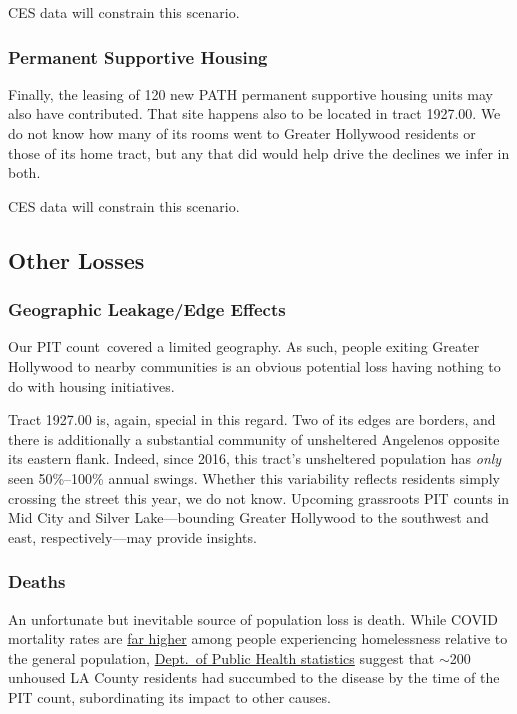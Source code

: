 \documentclass[11pt,twocolumn]{article}
\def\Count{count}
\def\resp{respectively}
\begin{document}
CES data will constrain this scenario.

\subsubsection{Permanent Supportive Housing}

Finally, the leasing of 120 new PATH permanent supportive housing units may also have contributed. 
That site happens also to be located in tract 1927.00. We do not know how many of its rooms went to Greater Hollywood 
residents or those of its home tract, but any that did would help drive the declines we infer in both.

CES data will constrain this scenario.

\subsection{Other Losses}

\subsubsection{Geographic Leakage/Edge Effects}

Our PIT \Count\ covered a limited geography. As such, people exiting Greater Hollywood to nearby communities
is an obvious potential loss having nothing to do with housing initiatives. 

Tract 1927.00 is, again, special in this regard. Two of its edges are borders, and there is additionally a substantial 
community of unsheltered Angelenos opposite its eastern flank. Indeed, since 2016, this tract's unsheltered
population has {\it only} seen 50\%--100\% annual swings. Whether this variability reflects residents 
simply crossing the street this year, we do not know. Upcoming grassroots PIT counts in Mid City and 
Silver Lake---bounding Greater Hollywood to the southwest and east, \resp---may provide insights.

\subsubsection{Deaths}

An unfortunate but inevitable source of population loss is death. While COVID mortality rates are
\href{https://www.medrxiv.org/content/10.1101/2021.03.05.21253019v1}{far higher} among people
experiencing homelessness relative to the general population, \href{http://publichealth.lacounty.gov/media/coronavirus/docs/SummaryReport_People_Experiencing_Homelessness.pdf}
{Dept.\ of Public Health statistics} suggest that $\sim$200 unhoused LA County residents had succumbed to the 
disease by the time of the PIT count, subordinating its impact to other causes.
\end{document}
